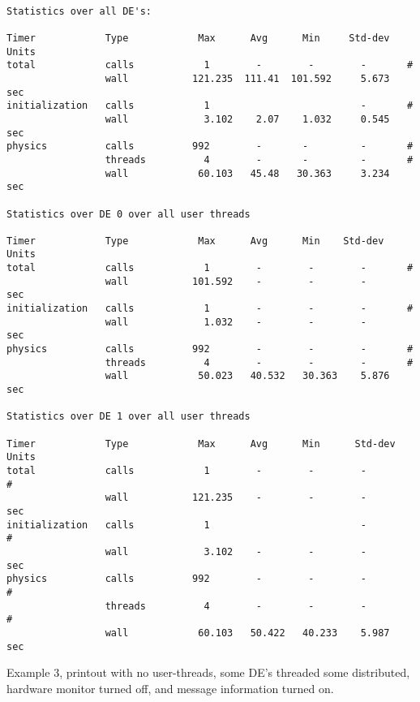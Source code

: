 {\tt
\begin{verbatim}
Statistics over all DE's:

Timer            Type            Max      Avg      Min     Std-dev  Units
total            calls            1        -        -        -       #
                 wall           121.235  111.41  101.592     5.673   sec
initialization   calls            1                          -       #
                 wall             3.102    2.07    1.032     0.545   sec
physics          calls          992        -       -         -       #
                 threads          4        -       -         -       #
                 wall            60.103   45.48   30.363     3.234   sec

Statistics over DE 0 over all user threads

Timer            Type            Max      Avg      Min    Std-dev  Units
total            calls            1        -        -        -       #
                 wall           101.592    -        -        -       sec
initialization   calls            1        -        -        -       #
                 wall             1.032    -        -        -       sec
physics          calls          992        -        -        -       #
                 threads          4        -        -        -       #
                 wall            50.023   40.532   30.363    5.876   sec

Statistics over DE 1 over all user threads

Timer            Type            Max      Avg      Min      Std-dev  Units
total            calls            1        -        -        -         #
                 wall           121.235    -        -        -         sec
initialization   calls            1                          -         #
                 wall             3.102    -        -        -         sec
physics          calls          992        -        -        -         #
                 threads          4        -        -        -         #
                 wall            60.103   50.422   40.233    5.987     sec
\end{verbatim}
}


Example 3, printout with no user-threads, some DE's threaded some distributed,
hardware monitor turned off, and message information turned on.

